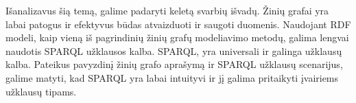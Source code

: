 \documentclass{VUMIFPSkursinis}
\begin{document}
Išanalizavus šią temą, galime padaryti keletą svarbių išvadų. Žinių grafai yra labai patogus ir efektyvus būdas atvaizduoti ir saugoti duomenis. Naudojant RDF modeli, kaip vieną iš pagrindinių žinių grafų modeliavimo metodų, galima lengvai naudotis SPARQL užklausos kalba. SPARQL, yra universali ir galinga užklausų kalba. Pateikus pavyzdinį žinių grafo aprašymą ir SPARQL užklausų scenarijus, galime matyti, kad SPARQL yra labai intuityvi ir jį galima pritaikyti įvairiems užklausų tipams. 


\printbibliography[heading=bibintoc]
\end{document}
